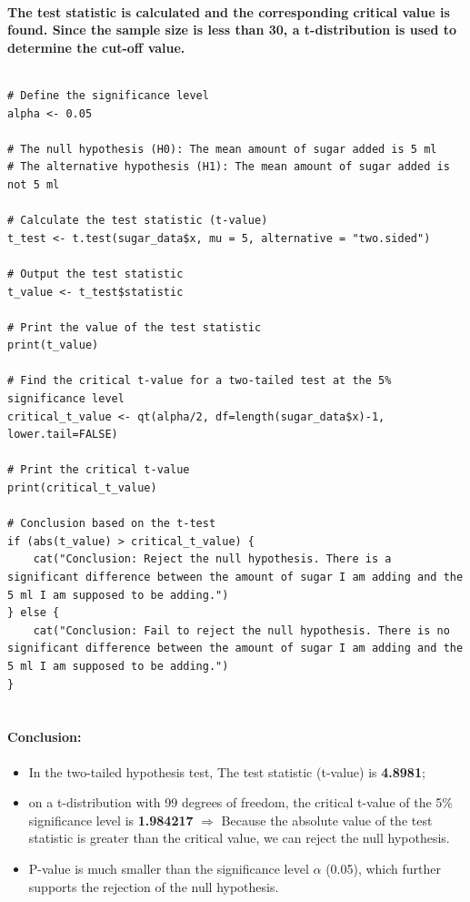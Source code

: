 \paragraph{The test statistic is calculated and the corresponding critical value is found. Since the sample size is less than 30, a t-distribution is used to determine the cut-off value.}
% 
% 
% 
% 
% 
$$ $$
% 
% 
% 
\begin{lstlisting}[style=rstyle]
# Define the significance level
alpha <- 0.05

# The null hypothesis (H0): The mean amount of sugar added is 5 ml
# The alternative hypothesis (H1): The mean amount of sugar added is not 5 ml

# Calculate the test statistic (t-value)
t_test <- t.test(sugar_data$x, mu = 5, alternative = "two.sided")

# Output the test statistic
t_value <- t_test$statistic

# Print the value of the test statistic
print(t_value)

# Find the critical t-value for a two-tailed test at the 5% significance level
critical_t_value <- qt(alpha/2, df=length(sugar_data$x)-1, lower.tail=FALSE)

# Print the critical t-value
print(critical_t_value)

# Conclusion based on the t-test
if (abs(t_value) > critical_t_value) {
    cat("Conclusion: Reject the null hypothesis. There is a significant difference between the amount of sugar I am adding and the 5 ml I am supposed to be adding.")
} else {
    cat("Conclusion: Fail to reject the null hypothesis. There is no significant difference between the amount of sugar I am adding and the 5 ml I am supposed to be adding.")
}
    
\end{lstlisting}
% 
% 
% 
% 
% 
% 
% 
% 
% 
\paragraph{\textbf{Conclusion:}}
% 
% 
% 
% 
% 
% 
% 
\begin{itemize}
    \item In the two-tailed hypothesis test, The test statistic (t-value) is \textbf{4.8981};
    \item on a t-distribution with 99 degrees of freedom, the critical t-value of the 5\% significance level is \textbf{1.984217} $\Rightarrow$ Because the absolute value of the test statistic is greater than the critical value, we can reject the null hypothesis.
    \item P-value is much smaller than the significance level $\alpha$ (0.05), which further supports the rejection of the null hypothesis.
\end{itemize}
% 
% 
% 
% 
% 
% 
% 